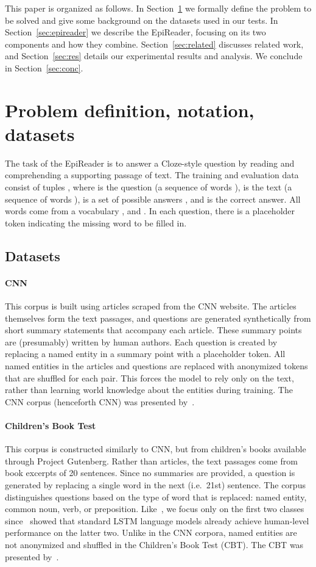 \documentclass[11pt,letterpaper]{article}
\begin{document}
This paper is organized as follows. In Section~\ref{sec:probnote} we formally define the problem to be solved and give some background on the datasets used in our tests. In Section~\ref{sec:epireader} we describe the EpiReader, focusing on its two components and how they combine. Section~\ref{sec:related} discusses related work, and Section~\ref{sec:res} details our experimental results and analysis. We conclude in Section~\ref{sec:conc}.

\section{Problem definition, notation, datasets}
\label{sec:probnote}
The task of the EpiReader is to answer a Cloze-style question by reading and comprehending a supporting passage of text. The training and evaluation data consist of tuples , where  is the question (a sequence of words ),  is the text (a sequence of words ),  is a set of possible answers , and  is the correct answer. All words come from a vocabulary , and . In each question, there is a placeholder token indicating the missing word to be filled in.



\subsection{Datasets}
\paragraph{CNN} This corpus is built using articles scraped from the CNN website. The articles themselves form the text passages, and questions are generated synthetically from short summary statements that accompany each article. These summary points are (presumably) written by human authors. Each question is created by replacing a named entity in a summary point with a placeholder token. All named entities in the articles and questions are replaced with anonymized tokens that are shuffled for each  pair. This forces the model to rely only on the text, rather than learning world knowledge about the entities during training. The CNN corpus (henceforth CNN) was presented by~.

\paragraph{Children's Book Test} This corpus is constructed similarly to CNN, but from children's books available through Project Gutenberg. Rather than articles, the text passages come from book excerpts of 20 sentences. Since no summaries are provided, a question is generated by replacing a single word in the next (i.e.~21st) sentence. The corpus distinguishes questions based on the type of word that is replaced: named entity, common noun, verb, or preposition. Like~, we focus only on the first two classes since~ showed that standard LSTM language models already achieve human-level performance on the latter two. Unlike in the CNN corpora, named entities are not anonymized and shuffled in the Children's Book Test (CBT). The CBT was presented by~.
\end{document}

